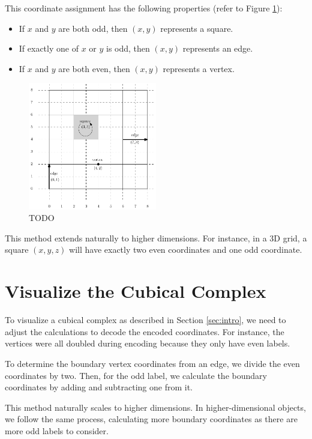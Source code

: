 \documentclass{article}
\begin{document}
    This coordinate assignment has the following properties (refer to Figure \ref{fig:dia2d}):
    \begin{itemize}
        \item If $x$ and $y$ are both odd, then $(x, y)$ represents a square.
        \item If exactly one of $x$ or $y$ is odd, then $(x, y)$ represents an edge.
        \item If $x$ and $y$ are both even, then $(x, y)$ represents a vertex.
    \end{itemize}
    
    \begin{figure}\label{fig:dia2d}
        \centering
        \includegraphics[width=0.5\textwidth]{dia2d.png}
        \caption{TODO}
    \end{figure}
    
    This method extends naturally to higher dimensions.
    For instance, in a 3D grid, a square $(x, y, z)$ will have exactly two even coordinates and one odd coordinate.
    
    \section{Visualize the Cubical Complex}\label{sec:vis}
    To visualize a cubical complex as described in Section \ref{sec:intro},
    we need to adjust the calculations to decode the encoded coordinates.
    For instance, the vertices were all doubled during encoding because they only
    have even labels.

    To determine the boundary vertex coordinates from an edge, we divide the even coordinates by two.
    Then, for the odd label, we calculate the boundary coordinates by adding and subtracting one from it.

    This method naturally scales to higher dimensions. In higher-dimensional objects,
    we follow the same process, calculating more boundary coordinates as there are more odd labels to consider.
\end{document}

